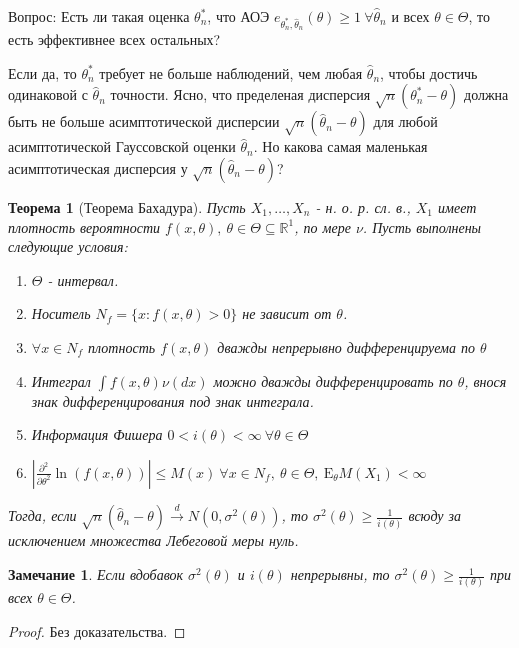 \documentclass[12pt]{article}
\newtheorem{remark}{Замечание}
\theoremstyle{basic_theorem}
\theoremstyle{name_theorem}
\newtheorem*{named_theorem}{Теорема}
\def\R{ \mathbb{R} }
\def\E{ \mathrm{E} }
\begin{document}
    Вопрос: Есть ли такая оценка \(\theta^*_n\), что АОЭ \(e_{\theta^*_n, \widehat{\theta}_n}(\theta) \geq 1 \ \forall \widehat{\theta}_n\)
    и всех \(\theta \in \Theta\), то есть эффективнее всех остальных?

    Если да, то \(\theta^*_n\) требует не больше наблюдений, чем любая \(\widehat{\theta}_n\), чтобы достичь одинаковой с \(\widehat{\theta}_n\) точности.
    Ясно, что пределеная дисперсия \(\sqrt{n}(\theta^*_n - \theta)\) должна быть не больше асимптотической дисперсии
    \(\sqrt{n}(\widehat{\theta}_n - \theta)\) для любой асимптотической Гауссовской оценки \(\widehat{\theta}_n\). Но
    какова самая маленькая асимптотическая дисперсия у \(\sqrt{n}(\widehat{\theta}_n - \theta)\)?

    \begin{named_theorem}[Теорема Бахадура]
        \label{th::bahadur}
        Пусть \(X_1, \ldots, X_n\) - н. о. р. сл. в., \(X_1\) имеет
        плотность вероятности \(f(x, \theta),\ \theta \in \Theta \subseteq \R^1\),
        по мере \(\nu\). Пусть выполнены следующие условия:
        \begin{enumerate}
            \item \(\Theta\) - интервал.
            \item Носитель \(N_f = \{x: f(x, \theta) > 0\}\) не зависит от \(\theta\).
            \item \label{th::bahadur:density} \(\forall x \in N_f\) плотность \(f(x, \theta)\) дважды непрерывно
                дифференцируема по \(\theta\)
            \item \label{th::bahadur:integral} Интеграл \(\int f(x, \theta)\nu(dx)\)  можно
                дважды дифференцировать по \(\theta\), внося знак
                дифференцирования под знак интеграла.
            \item Информация Фишера \(0 < i(\theta) < \infty \ \forall \theta \in \Theta\)
            \item \label{th::bahadur:second_partial} \(\left\lvert \frac{\partial^2}{\partial \theta^2} \ln(f(x, \theta)) \right\rvert  \leq M(x) \ \forall x \in N_f, \ \theta \in \Theta, \ \E_\theta M(X_1) < \infty\)
        \end{enumerate}
        Тогда, если \(\sqrt{n}(\widehat{\theta}_n - \theta) \xrightarrow{d} N(0, \sigma^2(\theta))\),
        то \(\sigma^2(\theta) \geq \frac{1}{i(\theta)}\) всюду за исключением
        множества Лебеговой меры нуль.
    \end{named_theorem}
    \begin{remark}
        Если вдобавок \(\sigma^2(\theta)\) и \(i(\theta)\) непрерывны,
        то \(\sigma^2(\theta) \geq \frac{1}{i(\theta)}\) при всех \(\theta \in \Theta\).
    \end{remark}
    \begin{proof}
        Без доказательства.
    \end{proof}
\end{document}
